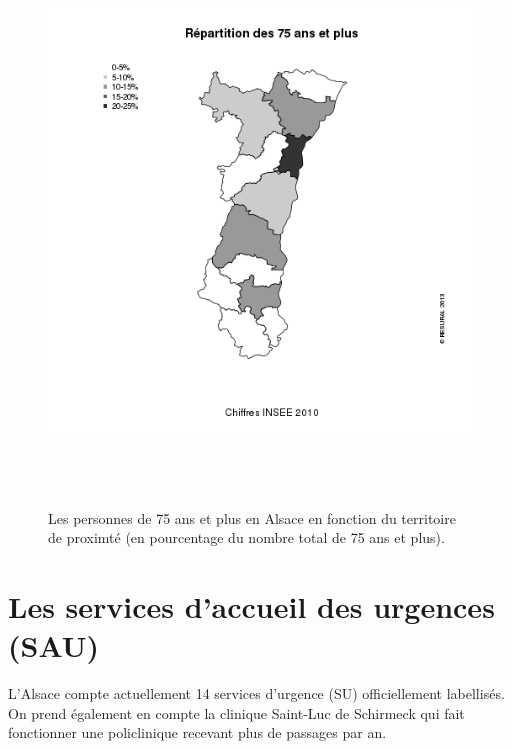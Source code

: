 \documentclass[12pt,english,french,twoside]{report}\usepackage[]{graphicx}\usepackage[]{color}
\begin{document}
\begin{figure}[ht]
 \centering
 \includegraphics[height=15cm,keepaspectratio=true]{../figure/75ans.png}
 \caption[Répartition des 75 ans et plus]{Les personnes de 75 ans et plus en Alsace en fonction du territoire de proximté (en pourcentage du nombre total de 75 ans et plus).}
 \label{fig:75ans}
\end{figure}

\section{Les services d'accueil des urgences (SAU)}

L'Alsace compte actuellement 14 services d'urgence (SU) officiellement labellisés. On prend également en compte la clinique Saint-Luc de Schirmeck qui fait fonctionner une policlinique recevant plus de  passages par an.
\end{document}
